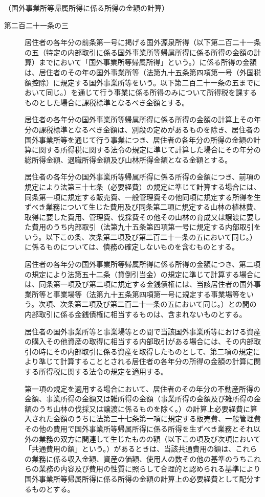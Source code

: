 \documentclass[twocolumn,a4j,10pt]{ltjtarticle}
\begin{document}
\noindent\hspace{10pt}（国外事業所等帰属所得に係る所得の金額の計算）
\begin{description}
\item[第二百二十一条の三]居住者の各年分の前条第一号に掲げる国外源泉所得（以下第二百二十一条の五（特定の内部取引に係る国外事業所等帰属所得に係る所得の金額の計算）までにおいて「国外事業所等帰属所得」という。）に係る所得の金額は、居住者のその年の国外事業所等（法第九十五条第四項第一号（外国税額控除）に規定する国外事業所等をいう。以下第二百二十一条の五までにおいて同じ。）を通じて行う事業に係る所得のみについて所得税を課するものとした場合に課税標準となるべき金額とする。
\item[]居住者の各年分の国外事業所等帰属所得に係る所得の金額の計算上その年分の課税標準となるべき金額は、別段の定めがあるものを除き、居住者の国外事業所等を通じて行う事業につき、居住者の各年分の所得の金額の計算に関する所得税に関する法令の規定に準じて計算した場合にその年分の総所得金額、退職所得金額及び山林所得金額となる金額とする。
\item[]居住者の各年分の国外事業所等帰属所得に係る所得の金額につき、前項の規定により法第三十七条（必要経費）の規定に準じて計算する場合には、同条第一項に規定する販売費、一般管理費その他同項に規定する所得を生ずべき業務について生じた費用及び同条第二項に規定する山林の植林費、取得に要した費用、管理費、伐採費その他その山林の育成又は譲渡に要した費用のうち内部取引（法第九十五条第四項第一号に規定する内部取引をいう。以下この条、次条第二項及び第二百二十一条の五において同じ。）に係るものについては、債務の確定しないものを含むものとする。
\item[]居住者の各年分の国外事業所等帰属所得に係る所得の金額につき、第二項の規定により法第五十二条（貸倒引当金）の規定に準じて計算する場合には、同条第一項及び第二項に規定する金銭債権には、当該居住者の国外事業所等と事業場等（法第九十五条第四項第一号に規定する事業場等をいう。次項、次条第二項及び第二百二十一条の五において同じ。）との間の内部取引に係る金銭債権に相当するものは、含まれないものとする。
\item[]居住者の国外事業所等と事業場等との間で当該国外事業所等における資産の購入その他資産の取得に相当する内部取引がある場合には、その内部取引の時にその内部取引に係る資産を取得したものとして、第二項の規定により準じて計算することとされる居住者の各年分の所得の金額の計算に関する所得税に関する法令の規定を適用する。
\item[]第一項の規定を適用する場合において、居住者のその年分の不動産所得の金額、事業所得の金額又は雑所得の金額（事業所得の金額及び雑所得の金額のうち山林の伐採又は譲渡に係るものを除く。）の計算上必要経費に算入された金額のうちに法第三十七条第一項に規定する販売費、一般管理費その他の費用で国外事業所等帰属所得に係る所得を生ずべき業務とそれ以外の業務の双方に関連して生じたものの額（以下この項及び次項において「共通費用の額」という。）があるときは、当該共通費用の額は、これらの業務に係る収入金額、資産の価額、使用人の数その他の基準のうちこれらの業務の内容及び費用の性質に照らして合理的と認められる基準により国外事業所等帰属所得に係る所得の金額の計算上の必要経費として配分するものとする。

\end{description}
\end{document}
